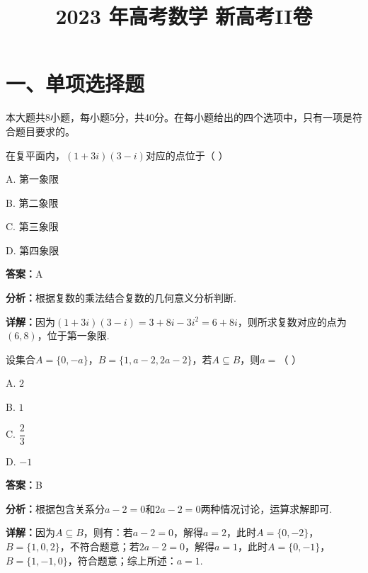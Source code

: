 ﻿\title{2023 年高考数学 新高考II卷}
\date{}
\maketitle

\section*{一、单项选择题}
本大题共8小题，每小题5分，共40分。在每小题给出的四个选项中，只有一项是符合题目要求的。

\begin{question}[points=5]
在复平面内，$(1+3i)(3-i)$对应的点位于（ \quad ）
\begin{choices}
  \item A. 第一象限
  \item B. 第二象限
  \item C. 第三象限
  \item D. 第四象限
\end{choices}
\begin{solution}
\textbf{答案：}A

\textbf{分析：}根据复数的乘法结合复数的几何意义分析判断.

\textbf{详解：}因为$(1+3i)(3-i)=3+8i-3i^2=6+8i$，则所求复数对应的点为$(6,8)$，位于第一象限.
\end{solution}
\end{question}

\begin{question}[points=5]
设集合$A=\{0,-a\}$，$B=\{1,a-2,2a-2\}$，若$A\subseteq B$，则$a=$（ \quad ）
\begin{choices}
  \item A. $2$
  \item B. $1$
  \item C. $\dfrac{2}{3}$
  \item D. $-1$
\end{choices}
\begin{solution}
\textbf{答案：}B

\textbf{分析：}根据包含关系分$a-2=0$和$2a-2=0$两种情况讨论，运算求解即可.

\textbf{详解：}因为$A\subseteq B$，则有：若$a-2=0$，解得$a=2$，此时$A=\{0,-2\}$，$B=\{1,0,2\}$，不符合题意；若$2a-2=0$，解得$a=1$，此时$A=\{0,-1\}$，$B=\{1,-1,0\}$，符合题意；综上所述：$a=1$.
\end{solution}
\end{question}

